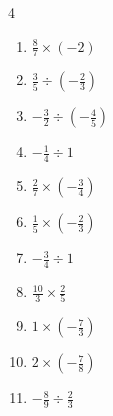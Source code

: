 \begin{multicols}{4}
\begin{enumerate}

  \item $\displaystyle \frac{8}{7}\times{}\left(-2\right)$


  \item $\displaystyle \frac{3}{5}\div{}\left(-\frac{2}{3}\right)$


  \item $\displaystyle -\frac{3}{2}\div{}\left(-\frac{4}{5}\right)$


  \item $\displaystyle -\frac{1}{4}\div{}1$


  \item $\displaystyle \frac{2}{7}\times{}\left(-\frac{3}{4}\right)$


\columnbreak %

\resetques

  \item $\displaystyle \frac{1}{5}\times{}\left(-\frac{2}{3}\right)$


  \item $\displaystyle -\frac{3}{4}\div{}1$


  \item $\displaystyle \frac{10}{3}\times{}\frac{2}{5}$


  \item $\displaystyle 1\times{}\left(-\frac{7}{3}\right)$


  \item $\displaystyle 2\times{}\left(-\frac{7}{8}\right)$


  \item $\displaystyle -\frac{8}{9}\div{}\frac{2}{3}$


\end{enumerate}
\end{multicols}
